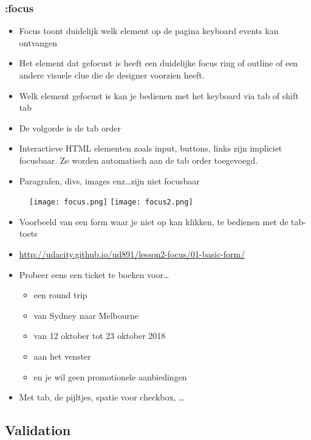 \documentclass{article}
\begin{document}
\subsubsection{:focus}
\begin{itemize}
    \item Focus toont duidelijk welk element op de pagina keyboard events kan ontvangen
    \item Het element dat gefocust is heeft een duidelijke focus ring of outline of een andere visuele clue die de designer voorzien heeft.
    \item Welk element gefocust is kan je bedienen met het keyboard via tab of shift tab
    \item De volgorde is de tab order
    \item Interactieve HTML elementen zoals input, buttons, links zijn impliciet focusbaar. Ze worden automatisch aan de tab order toegevoegd.
    \item Paragrafen, divs, images enz\dots zijn niet focusbaar
\end{itemize}

\begin{figure}[H]
    \centering
    \texttt{[image: focus.png]}
    \texttt{[image: focus2.png]}
    \caption{}
\end{figure}

\begin{itemize}
    \item Voorbeeld van een form waar je niet op kan klikken, te bedienen met de tab-toets
    \item \url{http://udacity.github.io/ud891/lesson2-focus/01-basic-form/}
    \item Probeer eens een ticket te boeken voor\dots
    \begin{itemize}
        \item een round trip
        \item van Sydney naar Melbourne
        \item van 12 oktober tot 23 oktober 2018
        \item aan het venster
        \item en je wil geen promotionele aanbiedingen
    \end{itemize}
    \item Met tab, de pijltjes, spatie voor checkbox, \dots
\end{itemize}

\subsection{Validation}
\end{document}
